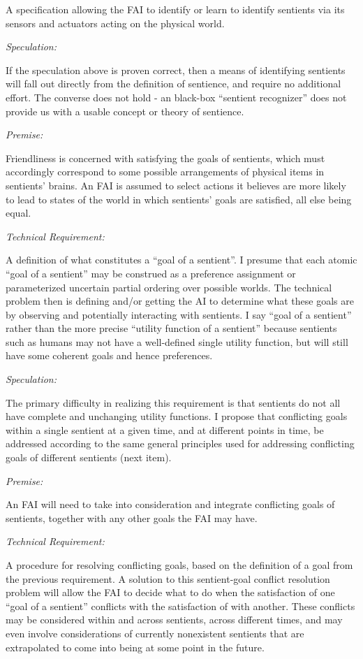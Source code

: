 \documentclass[twoside,11pt]{article}
\begin{document}
A specification allowing the FAI to identify or learn to identify sentients via
its sensors and actuators acting on the physical world.
 
\emph{Speculation:}

If the speculation above is proven correct, then a means of identifying
sentients will fall out directly from the definition of sentience, and require
no additional effort. The converse does not hold - an black-box ``sentient
recognizer'' does not provide us with a usable concept or theory of sentience.

\emph{Premise:}

Friendliness is concerned with satisfying the goals of sentients, which must
accordingly correspond to some possible arrangements of physical items in
sentients' brains. An FAI is assumed to select actions it believes are more
likely to lead to states of the world in which sentients' goals are satisfied,
all else being equal.

\emph{Technical Requirement:}

A definition of what constitutes a ``goal of a sentient''. I presume that each
atomic ``goal of a sentient'' may be construed as a preference assignment or
parameterized uncertain partial ordering over possible worlds. The technical
problem then is defining and/or getting the AI to determine what these goals
are by observing and potentially interacting with sentients. I say ``goal of a
sentient'' rather than the more precise ``utility function of a sentient''
because sentients such as humans may not have a well-defined single utility
function, but will still have some coherent goals and hence preferences.
 
\emph{Speculation:}

The primary difficulty in realizing this requirement is that sentients do not
all have complete and unchanging utility functions. I propose that conflicting
goals within a single sentient at a given time, and at different points in
time, be addressed according to the same general principles used for addressing
conflicting goals of different sentients (next item).

\emph{Premise:}

An FAI will need to take into consideration and integrate conflicting goals of
sentients, together with any other goals the FAI may have.

\emph{Technical Requirement:}

A procedure for resolving conflicting goals, based on the definition of a goal
from the previous requirement. A solution to this sentient-goal conflict
resolution problem will allow the FAI to decide what to do when the
satisfaction of one ``goal of a sentient'' conflicts with the satisfaction of
with another. These conflicts may be considered within and across sentients,
across different times, and may even involve considerations of currently
nonexistent sentients that are extrapolated to come into being at some point in
the future.
\end{document}
